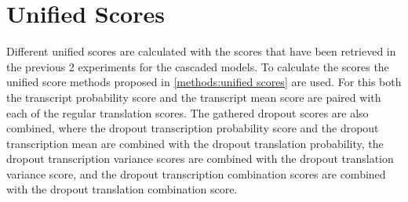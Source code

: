 \section{Unified Scores}
Different unified scores are calculated with the scores that have been retrieved in the previous 2 experiments for the cascaded models. To calculate the scores the unified score methods proposed in \autoref{methods:unified scores} are used. 
For this both the transcript probability score and the transcript mean score are paired with each of the regular translation scores. 
The gathered dropout scores are also combined, where the dropout transcription probability score and the dropout transcription mean are combined with the dropout translation probability, the dropout transcription variance scores are combined with the dropout translation variance score, and the dropout transcription combination scores are combined with the dropout translation combination score.
